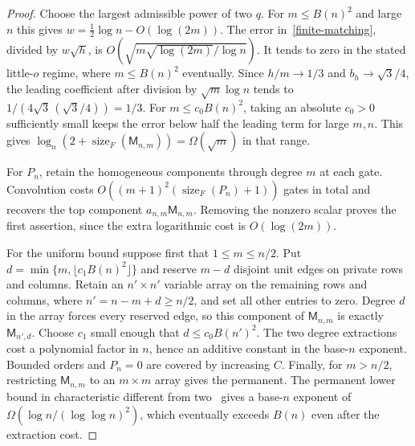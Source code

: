 \documentclass[11pt]{article}
\theoremstyle{remark}
\newcommand{\Match}{\mathsf M}
\newcommand{\sizeF}{\operatorname{size}_F}
\begin{document}
\begin{proof}
Choose the largest admissible power of two $q$. For $m\le B(n)^2$ and large $n$ this gives $w=\tfrac12\log n-O(\log(2m))$. The error in~\eqref{finite-matching}, divided by $w\sqrt h$, is
$O(\sqrt{m\sqrt{\log(2m)}/\log n})$.
It tends to zero in the stated little-$o$ regime, where $m\le B(n)^2$ eventually. Since $h/m\to1/3$ and $b_h\to\sqrt3/4$, the leading coefficient after division by $\sqrt m\log n$ tends to $1/(4\sqrt3\,(\sqrt3/4))=1/3$. For $m\le c_0 B(n)^2$, taking an absolute $c_0>0$ sufficiently small keeps the error below half the leading term for large $m,n$. This gives $\log_n(2+\sizeF(\Match_{n,m}))=\Omega(\sqrt m)$ in that range.

For $P_n$, retain the homogeneous components through degree $m$ at each gate. Convolution costs $O((m+1)^2(\sizeF(P_n)+1))$ gates in total and recovers the top component $a_{n,m}\Match_{n,m}$. Removing the nonzero scalar proves the first assertion, since the extra logarithmic cost is $O(\log(2m))$.

For the uniform bound suppose first that $1\le m\le n/2$. Put $d=\min\{m,\lfloor c_1 B(n)^2\rfloor\}$ and reserve $m-d$ disjoint unit edges on private rows and columns. Retain an $n'\times n'$ variable array on the remaining rows and columns, where $n'=n-m+d\ge n/2$, and set all other entries to zero. Degree $d$ in the array forces every reserved edge, so this component of $\Match_{n,m}$ is exactly $\Match_{n',d}$. Choose $c_1$ small enough that $d\le c_0 B(n')^2$. The two degree extractions cost a polynomial factor in $n$, hence an additive constant in the base-$n$ exponent. Bounded orders and $P_n=0$ are covered by increasing $C$. Finally, for $m>n/2$, restricting $\Match_{n,m}$ to an $m\times m$ array gives the permanent. The permanent lower bound in characteristic different from two~\cite{circuits} gives a base-$n$ exponent of $\Omega(\log n/(\log\log n)^2)$, which eventually exceeds $B(n)$ even after the extraction cost.
\end{proof}
\end{document}
